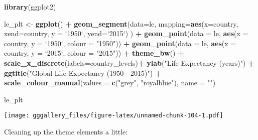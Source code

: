 \documentclass[]{book}
\newenvironment{Shaded}{\begin{snugshade}}{\end{snugshade}}
\newcommand{\DataTypeTok}[1]{\textcolor[rgb]{0.13,0.29,0.53}{#1}}
\newcommand{\KeywordTok}[1]{\textcolor[rgb]{0.13,0.29,0.53}{\textbf{#1}}}
\newcommand{\NormalTok}[1]{#1}
\newcommand{\OperatorTok}[1]{\textcolor[rgb]{0.81,0.36,0.00}{\textbf{#1}}}
\newcommand{\StringTok}[1]{\textcolor[rgb]{0.31,0.60,0.02}{#1}}
\begin{document}
\begin{Shaded}
\begin{Highlighting}[]
\KeywordTok{library}\NormalTok{(ggplot2)}


\NormalTok{le_plt <-}\StringTok{ }\KeywordTok{ggplot}\NormalTok{() }\OperatorTok{+}
\StringTok{  }\KeywordTok{geom_segment}\NormalTok{(}\DataTypeTok{data=}\NormalTok{le, }\DataTypeTok{mapping=}\KeywordTok{aes}\NormalTok{(}\DataTypeTok{x=}\NormalTok{country, }\DataTypeTok{xend=}\NormalTok{country,}
                                    \DataTypeTok{y =} \StringTok{`}\DataTypeTok{1950}\StringTok{`}\NormalTok{, }\DataTypeTok{yend=}\StringTok{`}\DataTypeTok{2015}\StringTok{`}\NormalTok{) ) }\OperatorTok{+}
\StringTok{  }\KeywordTok{geom_point}\NormalTok{(}\DataTypeTok{data =}\NormalTok{ le, }\KeywordTok{aes}\NormalTok{(}\DataTypeTok{x =}\NormalTok{ country, }\DataTypeTok{y =} \StringTok{`}\DataTypeTok{1950}\StringTok{`}\NormalTok{, }\DataTypeTok{colour =} \StringTok{"1950"}\NormalTok{)) }\OperatorTok{+}
\StringTok{  }\KeywordTok{geom_point}\NormalTok{(}\DataTypeTok{data =}\NormalTok{ le, }\KeywordTok{aes}\NormalTok{(}\DataTypeTok{x =}\NormalTok{ country, }\DataTypeTok{y =} \StringTok{`}\DataTypeTok{2015}\StringTok{`}\NormalTok{, }\DataTypeTok{colour =} \StringTok{"2015"}\NormalTok{)) }\OperatorTok{+}
\StringTok{  }\KeywordTok{theme_bw}\NormalTok{() }\OperatorTok{+}
\StringTok{  }\KeywordTok{scale_x_discrete}\NormalTok{(}\DataTypeTok{labels=}\NormalTok{country_levels)}\OperatorTok{+}
\StringTok{  }\KeywordTok{ylab}\NormalTok{(}\StringTok{"Life Expectancy (years)"}\NormalTok{) }\OperatorTok{+}
\StringTok{  }\KeywordTok{ggtitle}\NormalTok{(}\StringTok{"Global Life Expectancy (1950 - 2015)"}\NormalTok{) }\OperatorTok{+}
\StringTok{  }\KeywordTok{scale_colour_manual}\NormalTok{(}\DataTypeTok{values =} \KeywordTok{c}\NormalTok{(}\StringTok{"grey"}\NormalTok{, }\StringTok{"royalblue"}\NormalTok{), }\DataTypeTok{name =} \StringTok{""}\NormalTok{) }
  
\NormalTok{le_plt}
\end{Highlighting}
\end{Shaded}

\texttt{[image: gggallery\_files/figure-latex/unnamed-chunk-104-1.pdf]}

Cleaning up the theme elements a little:
\end{document}
